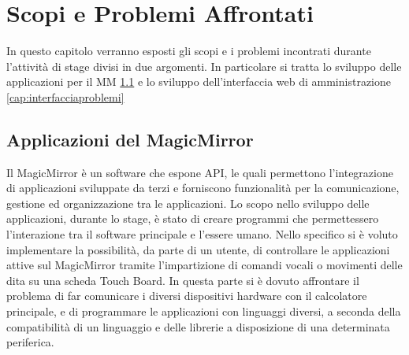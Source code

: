 \chapter{Scopi e Problemi Affrontati}\label{capitolo1}
In questo capitolo verranno esposti gli scopi e i problemi incontrati durante l'attivit\`a di stage divisi in due argomenti.
In particolare si tratta lo sviluppo delle applicazioni per il MM \ref{cap:moduliproblemi} e lo sviluppo dell'interfaccia web
di amministrazione \ref{cap:interfacciaproblemi}

\section{Applicazioni del MagicMirror}\label{cap:moduliproblemi}
Il MagicMirror \`e un software che espone API, le quali permettono
l'integrazione di applicazioni sviluppate da terzi e forniscono funzionalit\`a per la comunicazione, gestione
ed organizzazione tra le applicazioni.
Lo scopo nello sviluppo delle applicazioni, durante lo stage, \`e stato
di creare programmi che permettessero l'interazione tra il software principale
e l'essere umano. Nello specifico si \`e voluto implementare la possibilit\`a, da parte di un utente,
di controllare le applicazioni attive sul MagicMirror tramite l'impartizione di comandi vocali
o movimenti delle dita su una scheda Touch Board.
In questa parte si \`e dovuto affrontare il problema di far comunicare
i diversi dispositivi hardware con il calcolatore principale, e di programmare
le applicazioni con linguaggi diversi, a seconda della compatibilit\`a di un linguaggio
e delle librerie a disposizione di una determinata periferica.
\\[2\baselineskip]

